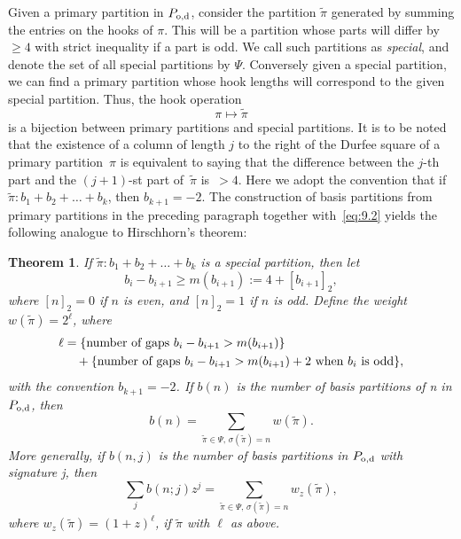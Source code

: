 \documentclass[pdftex]{sigma}
\numberwithin{equation}{section}
\newtheorem{Theorem}{Theorem}[section]
\theoremstyle{definition}
\begin{document}
Given a primary partition in $P_{\rm o,d}$, consider the partition $\tilde\pi$
generated by summing the entries on the hooks of $\pi$. This will be a
partition whose parts will differ by $\ge 4$ with strict inequality if a part
is odd. We call such partitions as {\it special},
and denote the set of all special partitions by $\Psi$.
Conversely given a special
partition, we can find a primary partition whose hook lengths will correspond
to the given special partition. Thus, the hook operation
\begin{equation}
\pi\mapsto \tilde\pi\label{eq:9.2}
\end{equation}
is a bijection between primary partitions and special partitions. It is to be
noted that the existence of a column of length $j$ to the right of the Durfee
square of a primary partition~$\pi$ is equivalent to saying
that the difference between the $j$-th part and the $(j+1)$-st part
of~$\tilde\pi$ is~${>4}$. Here we adopt the convention that if $\tilde\pi\colon
b_1+b_2+\dots +b_k$, then $b_{k+1}=-2$.
The construction of basis partitions from primary partitions in the preceding
paragraph together with~\eqref{eq:9.2} yields the following analogue to
Hirschhorn's theorem:

\begin{Theorem}
If $\tilde\pi\colon b_1+b_2+\dots+ b_k$ is a special partition, then let
\[
b_i - b_{i+1} \ge m(b_{i+1}) := 4 + [b_{i+1}]_2,
\]
where $[n]_2=0$ if $n$ is even, and $[n]_2=1$ if $n$ is odd.
Define the weight $w(\tilde\pi)=2^\ell$, where
\begin{align*}
\ell &= \{\mbox{number of gaps $ b_i - b_{i+1} > m(b_{i+1})$}\} \\
& \quad{}+
\{\mbox{number of gaps $ b_i - b_{i+1} > m(b_{i+1})+2$ when $b_i$ is odd}\},
\end{align*}
with the convention $b_{k+1}=-2$.
If $b(n)$ is the number of basis partitions of
n in $P_{\rm o,d}$, then
\begin{equation*}
b(n)=\sum_{\tilde\pi\in \Psi,\,\sigma(\tilde\pi)=n} w(\tilde\pi).%
\end{equation*}
More generally, if $b(n,j)$ is the number of basis partitions in
$P_{\rm o,d}$ {{with signature j, then}}
\begin{equation*}
\sum_jb(n;j)z^j=\sum_{\tilde\pi\in \Psi,\, \sigma(\tilde\pi)=n}w_z(\tilde\pi),%
\end{equation*}
where $w_z(\tilde\pi)=(1+z)^{\ell}$, if $\tilde\pi$ with $\ell$
as above.
\end{Theorem}
\end{document}

